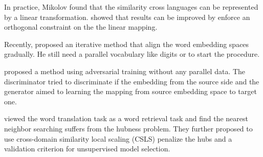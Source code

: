 In practice, Mikolov found that the similarity cross languages can be represented by a linear transformation.\cite{xing2015normalized} showed that results can be improved by enforce an orthogonal constraint on the the linear mapping.

Recently, \cite{artetxe2017learning} proposed an iterative method that align the word embedding spaces gradually. He still need a parallel vocabulary like digits or to start the procedure.

\cite{cao2016distribution}
 \cite{zhang2017adversarial} proposed a method using adversarial training without any parallel data. The discriminator tried to discriminate if the embedding from the source side and the generator aimed to learning the mapping from source embedding space to target one.



\cite{conneau2017word} viewed the word translation task as a word retrieval task and find the nearest neighbor searching suffers from the hubness problem. They further proposed to use cross-domain similarity local scaling (CSLS) penalize the hubs and a validation criterion for unsupervised model selection.











